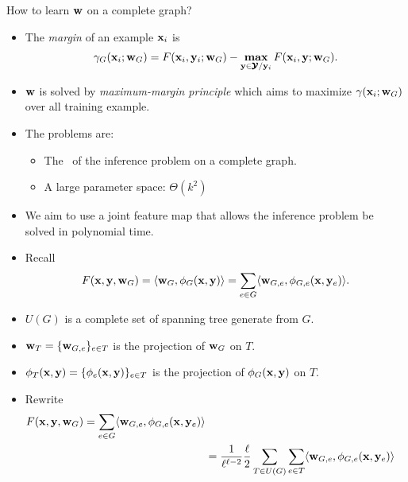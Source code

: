 \documentclass[first=dgreen,second=purple,logo=yellowexc]{aaltoslides}
\begin{document}
%
\begin{frame}{How to learn $\mathbf {w}$ on a complete graph?}
	\begin{itemize}
		\item The \textit{margin} of an example $\mathbf {x}_i$ is
		\begin{align*}
			\gamma_G(\mathbf {x}_i;\mathbf {w}_G) = F(\mathbf {x}_i,\mathbf {y}_i;\mathbf {w}_G) - \underset{\mathbf {y}\in\pmb {\mathcal{Y}}/\mathbf {y}_i}{\textbf{max}}\,F(\mathbf {x}_i,\mathbf {y};\mathbf {w}_G).
		\end{align*}
		\item $\mathbf {w}$ is solved by \textit{maximum-margin principle} which aims to maximize $\gamma(\mathbf {x}_i;\mathbf {w}_G)$ over all training example.
		\item The problems are:
		\begin{itemize}
			\item The \nphardness\ of the inference problem on a complete graph.
			\item A large parameter space: $\Theta(k^2)$
		\end{itemize}
		\item We aim to use a joint feature map that allows the inference problem be solved in polynomial time.
	\end{itemize}
\end{frame}



%
\begin{frame}{}
	\begin{itemize}
		\item Recall
		\begin{align*}
			F(\mathbf {x},\mathbf {y},\mathbf {w}_G) = \langle \mathbf {w}_G, \phi_G(\mathbf {x},\mathbf {y}) \rangle = \sum_{e\in G}\langle \mathbf {w}_{G,e}, \phi_{G,e}(\mathbf {x},\mathbf {y}_e) \rangle.
		\end{align*}
		\item $U(G)$ is a complete set of spanning tree generate from $G$.
		\item $\mathbf {w}_{T}=\{\mathbf {w}_{G,e}\}_{e\in T}$ is the projection of $\mathbf {w}_G$ on $T$.
		\item $\phi_T(\mathbf {x},\mathbf {y})=\{\phi_e(\mathbf {x},\mathbf {y})\}_{e\in T}$ is the projection of $\phi_G(\mathbf {x},\mathbf {y})$ on $T$.
		\item Rewrite
		\begin{align*}
			F(\mathbf {x},\mathbf {y},\mathbf {w}_G) = \sum_{e\in G}\langle \mathbf {w}_{G,e}, \phi_{G,e}(\mathbf {x},\mathbf {y}_e) \rangle \\
			& = \frac{1}{\ell^{\ell-2}}\frac{\ell}{2}\sum_{T\in U(G)}\sum_{e\in T}\langle \mathbf {w}_{G,e}, \phi_{G,e}(\mathbf {x},\mathbf {y}_e) \rangle
		\end{align*}
	\end{itemize}
\end{frame}
\end{document}
